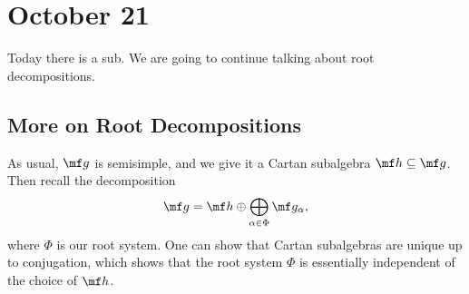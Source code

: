 \documentclass[../notes.tex]{subfiles}
\begin{document}
\section{October 21}
Today there is a sub. We are going to continue talking about root decompositions.

\subsection{More on Root Decompositions}
As usual, $\mf g$ is semisimple, and we give it a Cartan subalgebra $\mf h\subseteq\mf g$. Then recall the decomposition
\[\mf g=\mf h\oplus\bigoplus_{\alpha\in\Phi}\mf g_{\alpha},\]
where $\Phi$ is our root system. One can show that Cartan subalgebras are unique up to conjugation, which shows that the root system $\Phi$ is essentially independent of the choice of $\mf h$.
\end{document}
